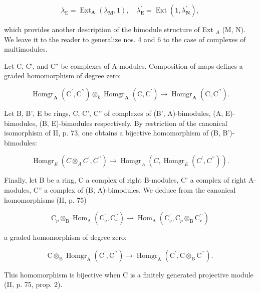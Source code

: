 \[
\lambda_ {\mathrm{E}} = \operatorname{Ext} _ {\mathbf {A}} \left(\lambda_ {\mathbf {M}}, 1\right), \quad \lambda_ {\mathrm{E}} ^ {\prime} = \operatorname{Ext} \left(1, \lambda_ {\mathbf {N}} ^ {\prime}\right),
\]

which provides another description of the bimodule structure of Ext \(_{A}\) (M, N). We leave it to the reader to generalize nos. 4 and 6 to the case of complexes of multimodules.

Let C, C′, and C′′ be complexes of A-modules. Composition of maps defines a graded homomorphism of degree zero:

\[
\operatorname{Homgr} _ {\mathbf {A}} \left(\mathrm{C} ^ {\prime}, \mathrm{C} ^ {\prime \prime}\right) \otimes_ {k} \operatorname{Homgr} _ {\mathbf {A}} \left(\mathrm{C}, \mathrm{C} ^ {\prime}\right)\rightarrow \operatorname{Homgr} _ {\mathbf {A}} \left(\mathrm{C}, \mathrm{C} ^ {\prime \prime}\right).\tag{14}
\]

Let B, B', E be rings, C, C', C'' of complexes of (B', A)-bimodules, (A, E)-bimodules, (B, E)-bimodules respectively. By restriction of the canonical isomorphism of II, p. 73, one obtains a bijective homomorphism of (B, B')-bimodules:

\[
\operatorname{Homgr} _ {E} \left(C \otimes_ {A} C ^ {\prime}, C ^ {\prime \prime}\right)\rightarrow \operatorname{Homgr} _ {A} \left(C, \operatorname{Homgr} _ {E} \left(C ^ {\prime}, C ^ {\prime \prime}\right)\right).\tag{15}
\]

Finally, let B be a ring, C a complex of right B-modules, C' a complex of right A-modules, C'' a complex of (B, A)-bimodules. We deduce from the canonical homomorphisms (II, p. 75)

\[
\mathrm{C} _ {p} \otimes_ {\mathrm{B}} \operatorname{Hom} _ {\mathrm{A}} \left(\mathrm{C} _ {q} ^ {\prime}, \mathrm{C} _ {r} ^ {\prime \prime}\right)\rightarrow \operatorname{Hom} _ {\mathrm{A}} \left(\mathrm{C} _ {q} ^ {\prime}, \mathrm{C} _ {p} \otimes_ {\mathrm{B}} \mathrm{C} _ {r} ^ {\prime \prime}\right)
\]

a graded homomorphism of degree zero:

\[
\mathrm{C} \otimes_ {\mathrm{B}} \operatorname{Homgr} _ {\mathrm{A}} \left(\mathrm{C} ^ {\prime}, \mathrm{C} ^ {\prime \prime}\right)\rightarrow \operatorname{Homgr} _ {\mathrm{A}} \left(\mathrm{C} ^ {\prime}, \mathrm{C} \otimes_ {\mathrm{B}} \mathrm{C} ^ {\prime \prime}\right).\tag{16}
\]

This homomorphism is bijective when C is a finitely generated projective module (II, p. 75, prop. 2).

